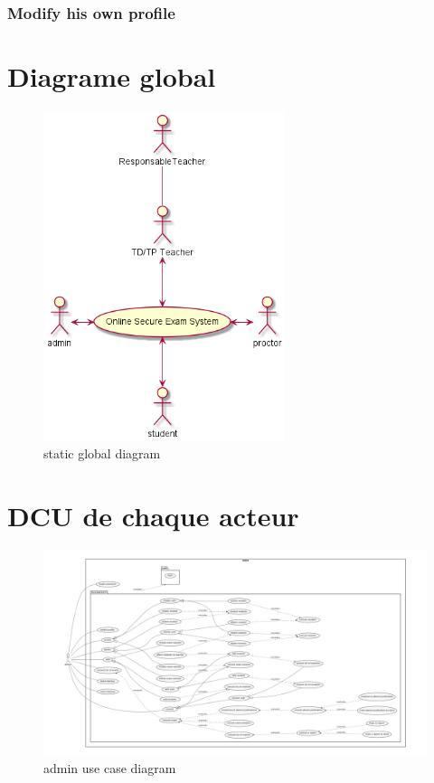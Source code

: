 \documentclass[a4paper,12p]{article}
\begin{document}
     \subsubsection{Modify his own profile}
     \vspace{5cm}
     \section{Diagrame global }
     \begin{figure}[h]
         \centering
         \includegraphics[width=200pt]{SCD}
         \caption{static global diagram}
     \end{figure}
     \clearpage
     \section{DCU de chaque acteur}
     \vspace{5cm} %

    \begin{figure}[h]
        \centering
        \includegraphics[width=\textwidth]{admin_UCD}
        \caption{admin use case diagram}
    \end{figure}
\end{document}
